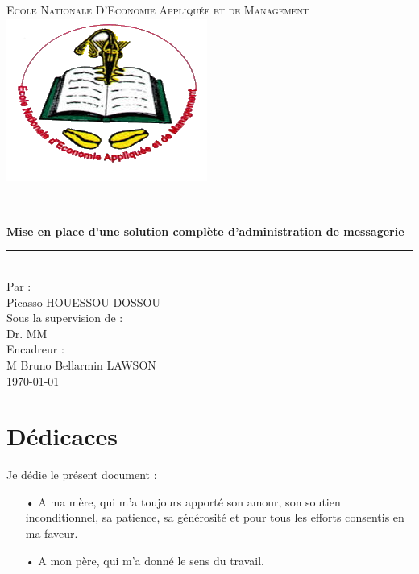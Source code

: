 \documentclass[a4paper,12pt,french]{report} %
\begin{document}
\begin{titlepage}
\newcommand{\HRule}{\rule{\linewidth}{0.5mm}}
\center
\textsc{\LARGE
Ecole Nationale D'Economie Appliquée et de Management
} \\[1cm]
\includegraphics[scale=1]{figure/eneam-logo.png} \\[1cm]
\HRule \\[0.4cm]
{ \huge \bfseries Mise en place d'une solution complète d'administration de messagerie \\[0.15cm] }
\HRule \\[1.5cm]
Par : \\[0.1cm]
Picasso HOUESSOU-DOSSOU \\[1cm]
Sous la supervision de :\\[0.1cm]
 Dr. MM \\ [1.5cm]
 Encadreur : \\[0.1cm]
 M Bruno Bellarmin LAWSON \\[1cm]
\today \\ [1cm]
\end{titlepage}

\onehalfspacing %

\chapter*{Dédicaces}
Je dédie le présent document :
\begin{itemize}
	\item[•] A ma mère, qui m'a toujours apporté son amour, son soutien inconditionnel, sa patience, sa générosité et pour tous les efforts consentis en ma faveur.
	\item[•] A mon père, qui m'a donné le sens du travail. 
\end{itemize}
\end{document}
